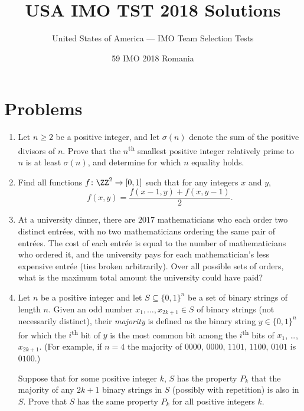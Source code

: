 \documentclass[11pt]{scrartcl}
\begin{document}
\title{USA IMO TST 2018 Solutions}
\subtitle{United States of America --- IMO Team Selection Tests}
\date{59 IMO 2018 Romania}

\maketitle

\tableofcontents
\newpage

\addtocounter{section}{-1}
\section{Problems}
\begin{enumerate}[\bfseries 1.]
\item %
Let $n \ge 2$ be a positive integer,
and let $\sigma(n)$ denote the sum of the positive divisors of $n$.
Prove that the $n$\textsuperscript{th} smallest positive integer
relatively prime to $n$ is at least $\sigma(n)$,
and determine for which $n$ equality holds.

\item %
Find all functions $f \colon \ZZ^2 \to [0,1]$
such that for any integers $x$ and $y$,
\[ f(x, y) = \frac{f(x-1, y) + f(x, y-1)}{2}. \]

\item %
At a university dinner,
there are $2017$ mathematicians who each order two distinct entr\'ees,
with no two mathematicians ordering the same pair of entr\'{e}es.
The cost of each entr\'ee is equal
to the number of mathematicians who ordered it,
and the university pays for each mathematician's
less expensive entr\'ee (ties broken arbitrarily).
Over all possible sets of orders,
what is the maximum total amount the university could have paid?

\item %
Let $n$ be a positive integer and let $S \subseteq \{0,1\}^n$
be a set of binary strings of length $n$.
Given an odd number $x_1, \dots, x_{2k+1} \in S$ of binary strings
(not necessarily distinct), their \emph{majority} is defined as
the binary string $y \in \{0,1\}^n$ for which
the $i$\textsuperscript{th} bit of $y$ is the most common bit
among the $i$\textsuperscript{th} bits of $x_1$, \dots, $x_{2k+1}$.
(For example, if $n=4$ the majority of
$0000$, $0000$, $1101$, $1100$, $0101$ is $0100$.)

Suppose that for some positive integer $k$,
$S$ has the property $P_k$ that the majority of any $2k+1$
binary strings in $S$ (possibly with repetition) is also in $S$.
Prove that $S$ has the same property $P_k$ for all
positive integers $k$.


\end{enumerate}
\end{document}
